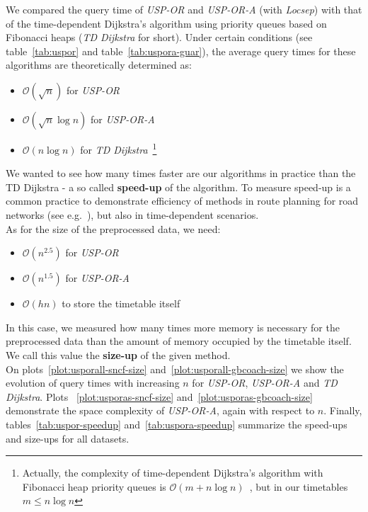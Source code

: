 \documentclass{svk_long_en}
\begin{document}
	We compared the query time of \textit{USP-OR} and \textit{USP-OR-A} (with \textit{Locsep}) with that of the time-dependent Dijkstra's algorithm using priority queues based on Fibonacci heaps (\textit{TD Dijkstra} for short). Under certain conditions (see table~\ref{tab:uspor} and table~\ref{tab:uspora-guar}), the average query times for these algorithms are theoretically determined as:
	\begin{itemize}
		\item $\mathcal{O}(\sqrt{n})$ for \textit{USP-OR}
		\item $\mathcal{O}(\sqrt{n} \log n)$ for \textit{USP-OR-A}
		\item $\mathcal{O}(n \log n)$ for \textit{TD Dijkstra}~\footnote{Actually, the complexity of time-dependent Dijkstra's algorithm with Fibonacci heap priority queues is $\mathcal{O}(m + n \log n)$~\cite{sommerthesis10}, but in our timetables $m \leq n \log n$}
	\end{itemize}
	\hspace{\fill}
	
	We wanted to see how many times faster are our algorithms in practice than the TD Dijkstra - a so called \textbf{speed-up} of the algorithm. To measure speed-up is a common practice to demonstrate efficiency of methods in route planning for road networks (see e.g.~\cite{engineeringroute09}), but also in time-dependent scenarios. \\
	
	As for the size of the preprocessed data, we need:
	\begin{itemize}
		\item $\mathcal{O}(n^{2.5})$ for \textit{USP-OR}
		\item $\mathcal{O}(n^{1.5})$ for \textit{USP-OR-A}
		\item $\mathcal{O}(h n)$ to store the timetable itself
	\end{itemize}
	\hspace{\fill}
	
	In this case, we measured how many times more memory is necessary for the preprocessed data than the amount of memory occupied by the timetable itself. We call this value the \textbf{size-up} of the given method. \\
	
	On plots~\ref{plot:usporall-sncf-size} and~\ref{plot:usporall-gbcoach-size} we show the evolution of query times with increasing $n$ for \textit{USP-OR}, \textit{USP-OR-A} and \textit{TD Dijkstra}. Plots ~\ref{plot:usporas-sncf-size} and~\ref{plot:usporas-gbcoach-size} demonstrate the space complexity of \textit{USP-OR-A}, again with respect to $n$. Finally, tables~\ref{tab:uspor-speedup} and~\ref{tab:uspora-speedup} summarize the speed-ups and size-ups for all datasets.
	
\end{document}
